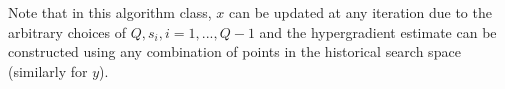 \documentclass{osudissert96}
\begin{document}
Note that in this algorithm class, $x$ can be updated at any iteration due to the arbitrary choices of $Q,s_i,i=1,...,Q-1$ and the hypergradient estimate can be constructed using any combination of points in the historical search space (similarly for $y$). 


%

 
\end{document}
